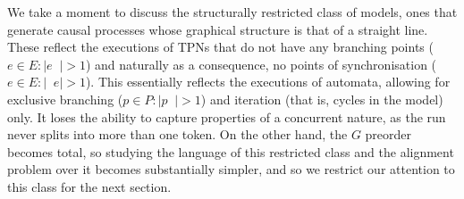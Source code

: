 \documentclass[conference]{IEEEtran}
\DeclareMathOperator*{\pre}{^\bullet}
\begin{document}
    We take a moment to discuss the structurally restricted class of models, ones that generate causal processes whose graphical structure is that of a straight line. 
    These reflect the executions of TPNs that do not have any branching points ($e \in E : |e \pre | > 1$) and naturally as a consequence, no points of synchronisation ($e \in E : |\pre e| > 1$). 
    This essentially reflects the executions of automata, allowing for exclusive branching ($p \in P : |p \pre| > 1$) and iteration (that is, cycles in the model) only. 
    It loses the ability to capture properties of a concurrent nature, as the run never splits into more than one token. 
    On the other hand, the $G$ preorder becomes total, so studying the language of this restricted class and the alignment problem over it becomes substantially simpler, and so we restrict our attention to this class for the next section. 
    
\end{document}
